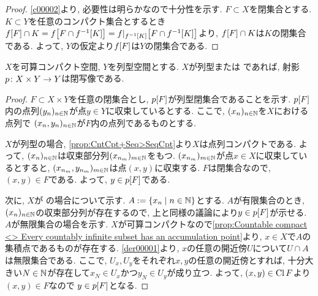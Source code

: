 \documentclass[uplatex, dvipdfmx, a4paper, 12pt, class=jsbook, crop=false]{standalone}
\begin{document}
\begin{proof}
	\cref{c00002}より, 必要性は明らかなので十分性を示す.
	$ F \subset X $を閉集合とする. $ K \subset Y $を任意のコンパクト集合とするとき
	$ \mapset{f}{F} \cap K = \mapset{f}{F \cap \mapinvset{f}{K}}
	= \mapset{f|_{\mapinvset{f}{K}}}{F \cap  \mapinvset{f}{K}} $より,
	$ \mapset{f}{F} \cap K $は$ K $の閉集合である.
	よって, $ Y $の仮定より$ \mapset{f}{F} $は$ Y $の閉集合である.
\end{proof}

\begin{proposition}
	$ X $を可算コンパクト空間, $ Y $を列型空間とする. $ X $が列型または  であれば,
	射影$ p\colon X \times Y\to Y $は閉写像である.
\end{proposition}

\begin{proof}
	$ F \subset X \times Y $を任意の閉集合とし, $ \mapset{p}{F} $が列型閉集合であることを示す.
	$ \mapset{p}{F} $内の点列$ (y_n)_{n \in \mathbb{N}} $が点$ y \in Y $に収束しているとする.
	ここで, $ (x_n)_{n \in \mathbb{N}} $を$ X $における点列で
	$ (x_n, y_n)_{n \in \mathbb{N}}  $が$ F $内の点列であるものとする.

	$ X $が列型の場合, \cref{prop:CntCpt+Seq>SeqCpt}より$ X $は点列コンパクトである.
	よって, $ (x_n)_{n \in \mathbb{N}} $は収束部分列$ (x_{n_m})_{m \in \mathbb{N}} $をもつ.
	$ (x_{n_m})_{m \in \mathbb{N}} $が点$ x \in X $に収束しているとすると,
	$ (x_{n_m}, y_{n_m})_{m \in \mathbb{N}} $は点$ (x, y) $に収束する.
	$ F $は閉集合なので, $ (x, y) \in F $である.
	よって, $ y \in \mapset{p}{F} $である.

	次に, $ X $が  の場合について示す.
	$ A \defeq \setcomp{x_n}{n \in \N} $とする.
	$ A $が有限集合のとき, $ (x_n)_{n \in \mathbb{N}} $の収束部分列が存在するので,
	上と同様の議論により$ y \in \mapset{p}{F} $が示せる.
	$ A $が無限集合の場合を示す.
	$ X $が可算コンパクトなので\cref{prop:Countable compact <> Every countably infinite subset has an accumulation point}より,
	$ x \in X $で$ A $の集積点であるものが存在する.
	\cref{der00001}より, $ x $の任意の開近傍$ U $について$ U \cap A $は無限集合である.
	ここで, $ U_x, U_y $をそれぞれ$ x, y $の任意の開近傍とすれば,
	十分大きい$ N \in \mathbb{N} $が存在して$ x_N \in U_x $かつ$ y_N \in U_y $が成り立つ.
	よって, $ (x, y) \in \mathop{\mathrm{Cl}}\nolimits F $より$ (x, y) \in F $なので
	$ y \in \mapset{p}{F} $となる.
\end{proof}
\end{document}
